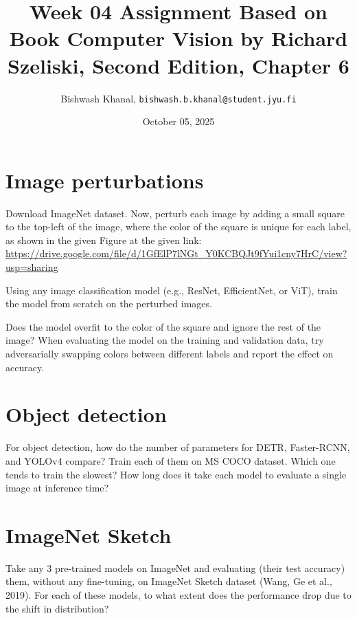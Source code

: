\documentclass[12pt,a4paper]{article}
\title{Week 04 Assignment Based on Book Computer Vision by Richard Szeliski, Second Edition, Chapter 6}
\author{Bishwash Khanal, \texttt{bishwash.b.khanal@student.jyu.fi}}
\date{October 05, 2025}
\begin{document}
\maketitle

\section{Image perturbations}
Download ImageNet dataset. Now, perturb each image by adding a small square to the top-left of the image, where the color of the square is unique for 
each label, as shown in the given Figure at the given link: \url{https://drive.google.com/file/d/1GfElP7lNGt_Y0KCBQJt9fYui1cny7HrC/view?usp=sharing}


Using any image classification model (e.g., ResNet, EfficientNet, or ViT), train the model from scratch on the perturbed images.


Does the model overfit to the color of the square and ignore the rest of the image? When evaluating the model on the training and validation data, 
try adversarially swapping colors between different labels and report the effect on accuracy.

\section{Object detection}
For object detection, how do the number of parameters for DETR, Faster-RCNN, and YOLOv4 compare? Train each of them on MS COCO dataset. 
Which one tends to train the slowest? How long does it take each model to evaluate a single image at inference time?

\section{ImageNet Sketch}
Take any 3 pre-trained models on ImageNet and evaluating (their test accuracy) them, without any fine-tuning, on ImageNet Sketch dataset 
(Wang, Ge et al., 2019). For each of these models, to what extent does the performance drop due to the shift in distribution?
\end{document}
